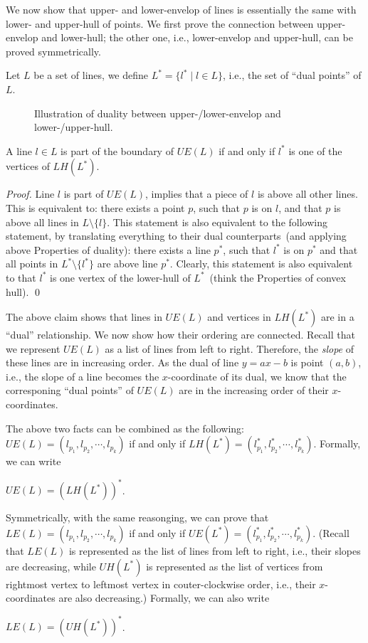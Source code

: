 We now show that upper- and lower-envelop of lines is essentially the same with lower- and upper-hull of points.
We first prove the connection between upper-envelop and lower-hull; the other one, i.e., lower-envelop and upper-hull, can be proved symmetrically.

Let $L$ be a set of lines, we define $L^* = \{l^* \mid l \in L\}$, i.e., the set of ``dual points'' of $L$.


\begin{figure}[h!]
\centering{}
\caption{Illustration of duality between upper-/lower-envelop and lower-/upper-hull.}
\end{figure}


\begin{claim}
A line $l\in L$ is part of the boundary of $UE(L)$ if and only if $l^*$ is one of the vertices
of $LH(L^*)$.
\end{claim}

{\it Proof.}
Line $l$ is part of $UE(L)$, implies that a piece of $l$ is above all other lines.
This is equivalent to: there exists a point $p$, such that $p$ is on $l$, and that
$p$ is above all lines in $L \setminus \{l\}$.
This statement is also equivalent to the following statement, 
by translating everything to their dual counterparts~(and applying above Properties of duality):
there exists a line $p^*$, such that $l^*$ is on $p^*$ and that
all points in $L^* \setminus \{l^*\}$ are above line $p^*$.
Clearly, this statement is also equivalent to that 
$l^*$ is one vertex of the lower-hull of $L^*$~(think the Properties of convex hull).
\qed

The above claim shows that lines in $UE(L)$ and
vertices in $LH(L^*)$ are in a ``dual'' relationship.
We now show how their ordering are connected.
Recall that we represent $UE(L)$ as a list of lines from left to right. Therefore, the
\emph{slope} of these lines are in increasing order. As the dual of line $y = ax - b$
is point $(a, b)$, i.e., the slope of a line becomes the $x$-coordinate of its dual,
we know that the corresponing ``dual points'' of $UE(L)$ are in the increasing
order of their $x$-coordinates.

The above two facts can be combined as the following: 
$UE(L) = (l_{p_1}, l_{p_2}, \cdots, l_{p_k})$ if and only if
$LH(L^*) = (l^*_{p_1}, l^*_{p_2}, \cdots, l^*_{p_k})$.
Formally, we can write
\begin{fact}
$UE(L) = (LH(L^*))^*$.
\end{fact}

Symmetrically, with the same reasonging, we can prove that
$LE(L) = (l_{p_1}, l_{p_2}, \cdots, l_{p_k})$ if and only if
$UE(L^*) = (l^*_{p_1}, l^*_{p_2}, \cdots, l^*_{p_k})$. (Recall
that $LE(L)$ is represented as the list of lines from left to right, i.e., their slopes are decreasing,
while $UH(L^*)$ is represented as the list of vertices
from rightmost vertex to leftmost vertex in couter-clockwise order, i.e., their $x$-coordinates are also decreasing.)
Formally, we can also write
\begin{fact}
$LE(L) = (UH(L^*))^*$.
\end{fact}
